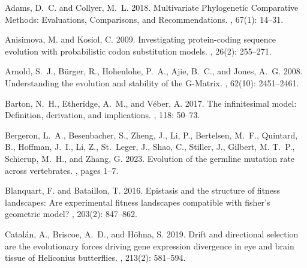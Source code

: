 \documentclass{article}
\begin{document}

\begin{thebibliography}{}

    Adams, D.~C. and Collyer, M.~L. 2018.
    \newblock Multivariate {{Phylogenetic Comparative Methods}}: {{Evaluations}},
        {{Comparisons}}, and {{Recommendations}}.
    , {67}(1): 14--31.

    Anisimova, M. and Kosiol, C. 2009.
    \newblock Investigating protein-coding sequence evolution with probabilistic
    codon substitution models.
    , {26}(2): 255--271.

    Arnold, S.~J., B{\"u}rger, R., Hohenlohe, P.~A., Ajie, B.~C., and Jones, A.~G.
    2008.
    \newblock Understanding the evolution and stability of the {{G-Matrix}}.
    , {62}(10): 2451--2461.

    Barton, N.~H., Etheridge, A.~M., and V{\'e}ber, A. 2017.
    \newblock The infinitesimal model: {{Definition}}, derivation, and
    implications.
    , {118}: 50--73.

    Bergeron, L.~A., Besenbacher, S., Zheng, J., Li, P., Bertelsen, M.~F.,
    Quintard, B., Hoffman, J.~I., Li, Z., St.~Leger, J., Shao, C., Stiller, J.,
    Gilbert, M. T.~P., Schierup, M.~H., and Zhang, G. 2023.
    \newblock Evolution of the germline mutation rate across vertebrates.
    , pages 1--7.

    Blanquart, F. and Bataillon, T. 2016.
    \newblock Epistasis and the structure of fitness landscapes: {{Are}}
    experimental fitness landscapes compatible with fisher's geometric model?
    , {203}(2): 847--862.

    Catal{\'a}n, A., Briscoe, A.~D., and H{\"o}hna, S. 2019.
    \newblock Drift and directional selection are the evolutionary forces driving
    gene expression divergence in eye and brain tissue of {{Heliconius}}
    butterflies.
    , {213}(2): 581--594.


\end{thebibliography}
\end{document}
